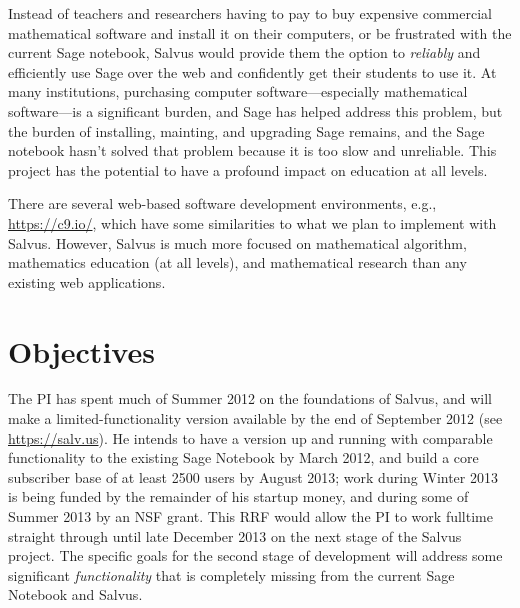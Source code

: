 \documentclass[11pt]{article}
\begin{document}
Instead of teachers and researchers having to pay to buy expensive
commercial mathematical software and install it on their computers, or
be frustrated with the current Sage notebook, Salvus would provide
them the option to {\em reliably} and efficiently use Sage over the
web and confidently get their students to use it.  At many
institutions, purchasing computer software---especially mathematical
software---is a significant burden, and Sage has helped address this
problem, but the burden of installing, mainting, and upgrading Sage
remains, and the Sage notebook hasn't solved that problem because it
is too slow and unreliable.  This project has the potential to have a
profound impact on education at all levels.

There are several web-based software development environments, e.g.,
\url{https://c9.io/}, which have some similarities to what we plan to
implement with Salvus.  However, Salvus is much more focused on
mathematical algorithm, mathematics education (at all levels), and
mathematical research than any existing web applications.

\section{Objectives}

The PI has spent much of Summer 2012 on the foundations of Salvus, and
will make a limited-functionality version available by the end of
September 2012 (see \url{https://salv.us}).  He intends to have a version up and running with
comparable functionality to the existing Sage Notebook by March 2012,
and build a core subscriber base of at least 2500 users by August
2013; work during Winter 2013 is being funded by the remainder of his
startup money, and during some of Summer 2013 by an NSF grant.  This
RRF would allow the PI to work fulltime straight through until late
December 2013 on the next stage of the Salvus project. The specific
goals for the second stage of development will address some
significant {\em functionality} that is completely missing from the
current Sage Notebook and Salvus.
\end{document}
